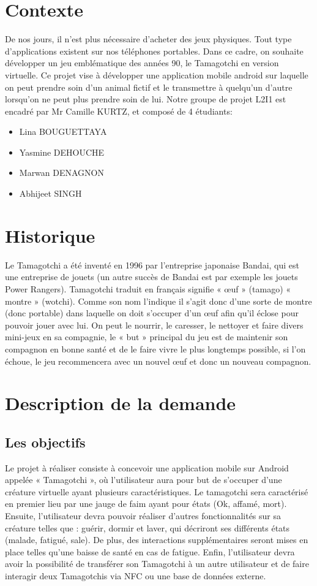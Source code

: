 \documentclass{cahier_des_charges}
\begin{document}
\section{Contexte}
De nos jours, il n’est plus nécessaire d’acheter des jeux physiques. Tout type d’applications existent sur nos téléphones portables. Dans ce cadre, on souhaite développer un jeu emblématique des années 90, le Tamagotchi en version virtuelle. Ce projet vise à développer une application mobile android sur laquelle on peut prendre soin d’un animal fictif et le transmettre à quelqu’un d’autre lorsqu’on ne peut plus prendre soin de lui.
Notre groupe de projet L2I1 est encadré par Mr Camille KURTZ, et composé de 4 étudiants:
\begin{itemize}[label=\textbullet]
\item Lina BOUGUETTAYA


\item Yasmine DEHOUCHE


\item Marwan DENAGNON


\item Abhijeet SINGH
\end{itemize}
\section{Historique}
Le Tamagotchi a été inventé en 1996 par l’entreprise japonaise Bandai, qui est une entreprise de jouets (un autre succès de Bandai est par exemple les jouets Power Rangers). 
Tamagotchi traduit en français signifie « œuf » (tamago) « montre » (wotchi). Comme son nom l’indique il s’agit donc d’une sorte de montre (donc portable) dans laquelle on doit s’occuper d’un œuf afin qu’il éclose pour pouvoir jouer avec lui. 
On peut le nourrir, le caresser, le nettoyer et faire divers mini-jeux en sa compagnie, le « but » principal du jeu est de maintenir son compagnon en bonne santé et de le faire vivre le plus longtemps possible, si l’on échoue, le jeu recommencera avec un nouvel œuf et donc un nouveau compagnon.
\section{Description de la demande}
\subsection{Les objectifs}
Le projet à réaliser consiste à concevoir une application mobile sur Android appelée « Tamagotchi », où l’utilisateur aura pour but de s’occuper d’une créature virtuelle ayant plusieurs caractéristiques.
Le tamagotchi sera caractérisé en premier lieu par une jauge de faim ayant pour états (Ok, affamé, mort). Ensuite, l’utilisateur devra pouvoir réaliser d’autres fonctionnalités sur sa créature telles que : guérir, dormir et laver, qui décriront ses différents états (malade, fatigué, sale).
De plus, des interactions supplémentaires seront mises en place telles qu’une baisse de santé en cas de fatigue.
Enfin, l’utilisateur devra avoir la possibilité de transférer son Tamagotchi à un autre utilisateur et de faire interagir deux Tamagotchis via NFC ou une base de données externe.
\end{document}
